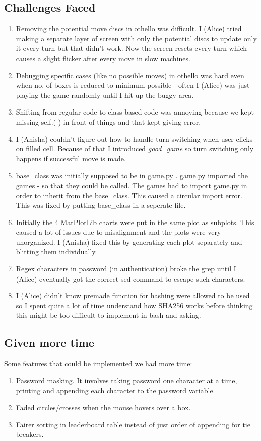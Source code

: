 \documentclass[12pt]{article}
\begin{document}
\subsection {Challenges Faced} 
\begin{enumerate}
    \item Removing the potential move discs in othello was difficult. I (Alice) tried making a separate layer of screen with only the potential discs to update only it every turn but that didn't work. Now the screen resets every turn which causes a slight flicker after every move in slow machines.
    \item Debugging specific cases (like no possible moves) in othello was hard even when no. of boxes is reduced to minimum possible - often I (Alice) was just playing the game randomly until I hit up the buggy area.  
    \item Shifting from regular code to class based code was annoying because we kept missing self.(  ) in front of things and that kept giving error. 
    \item I (Anisha) couldn't figure out how to handle turn switching when user clicks on filled cell. Because of that I introduced \textit{good\_game} so turn switching only happens if successful move is made. 
    \item base\_class was initially supposed to be in game.py . game.py imported the games - so that they could be called. The games had to import game.py in order to inherit from the base\_class. This caused
    a circular import error. This was fixed by putting base\_class in a seperate 
    file.
    \item Initially the 4 MatPlotLib charts were put in the same plot as subplots. This caused a lot of issues due to misalignment and the plots 
    were very unorganized. I (Anisha) fixed this by generating each plot separately and blitting them individually.
    \item Regex characters in password (in authentication) broke the grep until I (Alice) eventually got the correct sed command to escape such characters.
    \item I (Alice) didn't know premade function for hashing were allowed to be used so I spent quite a lot of time understand how SHA256 works before thinking this might be too difficult to implement in bash and asking.
    
\end{enumerate}
\subsection{Given more time} 
Some features that could be implemented we had more time:
\begin{enumerate}
    \item Password masking. It involves taking password one character at a time, printing \* and appending each character to the password variable. 
    \item Faded circles/crosses when the mouse hovers over a box. 
    \item Fairer sorting in leaderboard table instead of just order of appending for tie breakers. 
\end{enumerate}

\nocite{*}
\printbibliography 
\end{document}
